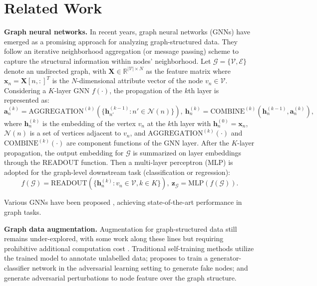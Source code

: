 \section{Related Work} \label{related_work}
\textbf{Graph neural networks.}
In recent years, graph neural networks (GNNs) \cite{kipf2016semi,velivckovic2017graph,xu2018powerful} have emerged as a promising approach for analyzing graph-structured data. 
They follow an iterative neighborhood aggregation (or message passing) scheme to capture the structural information within nodes' neighborhood.
Let $\mathcal{G} = \{ \mathcal{V}, \mathcal{E} \}$ denote an undirected graph,
with $\boldsymbol{X} \in \mathbb{R}^{|\mathcal{V}| \times N}$ as the feature matrix
where $\boldsymbol{x}_n = \boldsymbol{X}[n, :]^T$ is the $N$-dimensional attribute vector of the node $v_n \in \mathcal{V}$.
Considering a $K$-layer GNN $f(\cdot)$, the propagation of the $k$th layer is represented as:
\begin{equation}
    \boldsymbol{a}_n^{(k)} = \mathrm{AGGREGATION}^{(k)}(\{ \boldsymbol{h}_{n'}^{(k-1)}: n' \in \mathcal{N}(n) \}), \:
    \boldsymbol{h}_n^{(k)} = \mathrm{COMBINE}^{(k)}(\boldsymbol{h}_{n}^{(k-1)}, \boldsymbol{a}_n^{(k)}),
\end{equation}
where $\boldsymbol{h}_n^{(k)}$ is the embedding of the vertex $v_n$ at the $k$th layer with $\boldsymbol{h}_n^{(0)} = \boldsymbol{x}_n$,
$\mathcal{N}(n)$ is a set of vertices adjacent to $v_n$,
and $\mathrm{AGGREGATION}^{(k)}(\cdot)$ and $\mathrm{COMBINE}^{(k)}(\cdot)$ are component functions of the GNN layer.
After the $K$-layer propagation, the output embedding for $\mathcal{G}$ is summarized on layer embeddings through the READOUT function. Then a multi-layer perceptron (MLP) is adopted for the graph-level downstream task (classification or regression):
\begin{equation} \label{eq:gnn}
    f(\mathcal{G}) = \mathrm{READOUT}(\{ \boldsymbol{h}_{n}^{(k)}: v_n \in \mathcal{V}, k \in K \}), \: \boldsymbol{z}_\mathcal{G} = \mathrm{MLP}(f(\mathcal{G})).
\end{equation}

Various GNNs have been proposed \cite{kipf2016semi,velivckovic2017graph,xu2018powerful}, achieving state-of-the-art performance in graph tasks.

\textbf{Graph data augmentation.}
Augmentation for graph-structured data still remains under-explored,
with some work along these lines but requiring prohibitive additional computation cost \cite{verma2019graphmix}.
Traditional self-training methods \cite{verma2019graphmix,li2018deeper} utilize the trained model to annotate unlabelled data;
\cite{ding2018semi} proposes to train a generator-classifier network in the adversarial learning setting to generate fake nodes; and
\cite{deng2019batch,feng2019graph}
generate adversarial perturbations to node feature over the graph structure.

